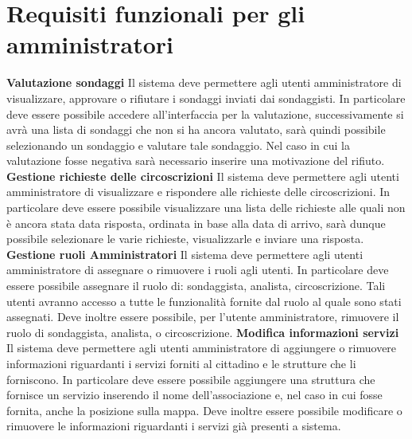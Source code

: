    \section{Requisiti funzionali per gli amministratori}
        \begin{rfList}
            \rfItem \textbf{Valutazione sondaggi} Il sistema deve permettere agli utenti amministratore di visualizzare, approvare o rifiutare i sondaggi inviati dai sondaggisti. In particolare deve essere possibile accedere all'interfaccia per la valutazione, successivamente si avrà una lista di sondaggi che non si ha ancora valutato, sarà quindi possibile selezionando un sondaggio e valutare tale sondaggio. Nel caso in cui la valutazione fosse negativa sarà necessario inserire una motivazione del rifiuto.
            \rfItem \textbf{Gestione richieste delle circoscrizioni} Il sistema deve permettere agli utenti amministratore di visualizzare e rispondere alle richieste delle circoscrizioni. In particolare deve essere possibile visualizzare una lista delle richieste alle quali non è ancora stata data risposta, ordinata in base alla data di arrivo, sarà dunque possibile selezionare le varie richieste, visualizzarle e inviare una risposta.
            \rfItem \textbf{Gestione ruoli Amministratori} Il sistema deve permettere agli utenti amministratore di assegnare o rimuovere i ruoli agli utenti. In particolare deve essere possibile assegnare il ruolo di: sondaggista, analista, circoscrizione. Tali utenti avranno accesso a tutte le funzionalità fornite dal ruolo al quale sono stati assegnati. Deve inoltre essere possibile, per l'utente amministratore, rimuovere il ruolo di sondaggista, analista, o circoscrizione.
            \rfItem \textbf{Modifica informazioni servizi} Il sistema deve permettere agli utenti amministratore di aggiungere o rimuovere informazioni riguardanti i servizi forniti al cittadino e le strutture che li forniscono. In particolare deve essere possibile aggiungere una struttura che fornisce un servizio inserendo il nome dell'associazione e, nel caso in cui fosse fornita, anche la posizione sulla mappa. Deve inoltre essere possibile modificare o rimuovere le informazioni riguardanti i servizi già presenti a sistema.
        \end{rfList}